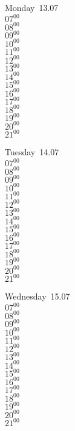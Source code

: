 \documentclass[11pt,a4paper]{book}\usepackage[]{graphicx}\usepackage[]{color}
\begin{document}
\begin{headerbox}
\end{headerbox}
\begin{weekdaybox}
  Monday~13.07\\
  { 
  \vfill
  $07^{00}$\\
$08^{00}$\\
$09^{00}$\\
$10^{00}$\\
$11^{00}$\\
$12^{00}$\\
$13^{00}$\\
$14^{00}$\\
$15^{00}$\\
$16^{00}$\\
$17^{00}$\\
$18^{00}$\\
$19^{00}$\\
$20^{00}$\\
$21^{00}$\\
  }
\end{weekdaybox}
\begin{weekdaybox}
  Tuesday~14.07\\
  { 
  \vfill
  $07^{00}$\\
$08^{00}$\\
$09^{00}$\\
$10^{00}$\\
$11^{00}$\\
$12^{00}$\\
$13^{00}$\\
$14^{00}$\\
$15^{00}$\\
$16^{00}$\\
$17^{00}$\\
$18^{00}$\\
$19^{00}$\\
$20^{00}$\\
$21^{00}$\\
  }
\end{weekdaybox}
\begin{weekdaybox}
  Wednesday~15.07\\
  { 
  \vfill
  $07^{00}$\\
$08^{00}$\\
$09^{00}$\\
$10^{00}$\\
$11^{00}$\\
$12^{00}$\\
$13^{00}$\\
$14^{00}$\\
$15^{00}$\\
$16^{00}$\\
$17^{00}$\\
$18^{00}$\\
$19^{00}$\\
$20^{00}$\\
$21^{00}$\\
  }
\end{weekdaybox}
\end{document}
